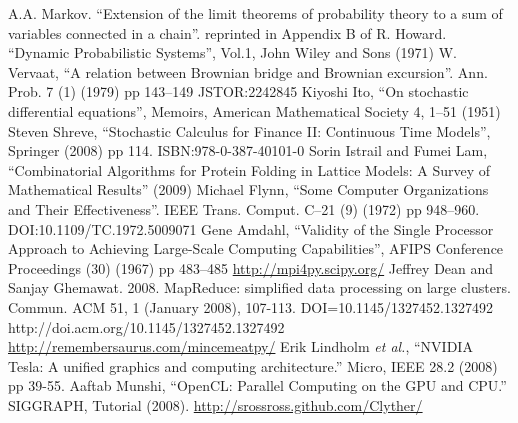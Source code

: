 \documentclass[justified,sixbynine]{tufte-book}
\theoremstyle{plain}%
\theoremstyle{definition}
\theoremstyle{remark}
\begin{document}
\begin{thebibliography}{999}
 A.A. Markov. ``Extension of the limit theorems of probability theory to a sum of variables connected in a chain''. reprinted in Appendix B of R. Howard. ``Dynamic Probabilistic Systems'', Vol.1, John Wiley and Sons (1971)
 W. Vervaat, ``A relation between Brownian bridge and Brownian excursion''. Ann. Prob. 7 (1) (1979) pp 143–149 JSTOR:2242845
 Kiyoshi Ito, ``On stochastic differential equations'', Memoirs, American Mathematical Society 4, 1–51 (1951)
 Steven Shreve, ``Stochastic Calculus for Finance II: Continuous Time Models'', Springer (2008) pp 114. ISBN:978-0-387-40101-0
 Sorin Istrail and Fumei Lam, ``Combinatorial Algorithms for Protein Folding in Lattice Models: A Survey of Mathematical Results'' (2009)
 Michael Flynn, ``Some Computer Organizations and Their Effectiveness''. IEEE Trans. Comput. C–21 (9) (1972) pp 948–960. DOI:10.1109/TC.1972.5009071
 Gene Amdahl, ``Validity of the Single Processor Approach to Achieving Large-Scale Computing Capabilities'', AFIPS Conference Proceedings (30) (1967) pp 483–485
 \url{http://mpi4py.scipy.org/}
 Jeffrey Dean and Sanjay Ghemawat. 2008. MapReduce: simplified data processing on large clusters. Commun. ACM 51, 1 (January 2008), 107-113. DOI=10.1145/1327452.1327492 http://doi.acm.org/10.1145/1327452.1327492
 \url{http://remembersaurus.com/mincemeatpy/}
 Erik Lindholm {\it et al.}, ``NVIDIA Tesla: A unified graphics and computing architecture.'' Micro, IEEE 28.2 (2008) pp 39-55.
 Aaftab Munshi, ``OpenCL: Parallel Computing on the GPU and CPU.'' SIGGRAPH, Tutorial (2008).
 \url{http://srossross.github.com/Clyther/}
\end{thebibliography}
\end{document}
